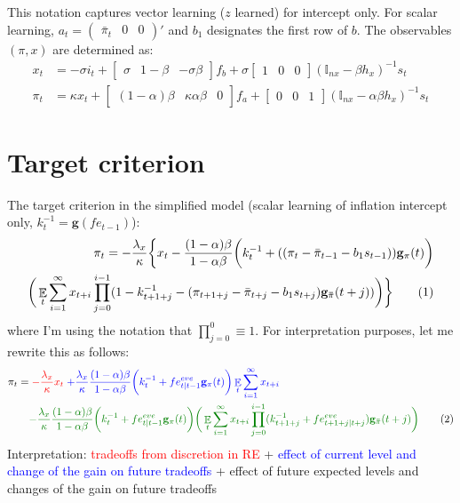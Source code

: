 \documentclass[11pt]{article}
\renewcommand{\[}{\begin{equation}}
\renewcommand{\]}{\end{equation}}
\DeclareMathOperator{\E}{\mathbb{E}}
\newcommand\numberthis{\addtocounter{equation}{1}\tag{\theequation}} %
\begin{document}
This notation captures vector learning ($z$ learned) for intercept only. For scalar learning, $a_t= \begin{pmatrix} \bar{\pi}_t & 0 & 0\end{pmatrix}' $ and $b_1$ designates the first row of $b$. The observables $(\pi, x)$ are determined as:
\begin{align}
x_t &=  -\sigma i_t + \begin{bmatrix} \sigma & 1-\beta & -\sigma\beta \end{bmatrix} f_b + \sigma \begin{bmatrix} 1 & 0 & 0 \end{bmatrix} (\mathbb{I}_{nx} - \beta h_x)^{-1} s_t \label{A9} \\
\pi_t &= \kappa x_t  + \begin{bmatrix} (1-\alpha)\beta & \kappa\alpha\beta & 0 \end{bmatrix}  f_a + \begin{bmatrix} 0 & 0 & 1 \end{bmatrix}  (\mathbb{I}_{nx} - \alpha \beta h_x)^{-1}  s_t \label{A10}
\end{align}

\section{Target criterion}\label{target_crit_levels}
The target criterion in the simplified model (scalar learning of inflation intercept only, $k_t^{-1} = \mathbf{g}(fe_{t-1})$):
\begin{align*}
\pi_t  = -\frac{\lambda_x}{\kappa}\bigg\{x_t - \frac{(1-\alpha)\beta}{1-\alpha\beta} \bigg(k_t^{-1}+((\pi_t - \bar{\pi}_{t-1}-b_1 s_{t-1}))\mathbf{g}_{\pi}(t) \bigg) \\
\bigg(\E_t\sum_{i=1}^{\infty}x_{t+i}\prod_{j=0}^{i-1}(1-k_{t+1+j}^{-1} - (\pi_{t+1+j} - \bar{\pi}_{t+j}-b_1 s_{t+j})\mathbf{g_{\bar{\pi}}}(t+j)) \bigg)
\bigg\} \numberthis \label{target}
\end{align*}
where I'm using the notation that $\prod_{j=0}^{0} \equiv 1$. For interpretation purposes, let me rewrite this as follows:
\begin{align*}
\pi_t  = & \; \textcolor{red}{-\frac{\lambda_x}{\kappa} x_t} \textcolor{blue}{ \; + \frac{\lambda_x}{\kappa} \frac{(1-\alpha)\beta}{1-\alpha\beta} \bigg(k_t^{-1}+ fe^{eve}_{t|t-1}\mathbf{g}_{\pi}(t) \bigg)\E_t\sum_{i=1}^{\infty}x_{t+i}}  \\
& \textcolor{mygreen}{- \frac{\lambda_x}{\kappa} \frac{(1-\alpha)\beta}{1-\alpha\beta} \bigg(k_t^{-1}+ fe^{eve}_{t|t-1}\mathbf{g}_{\pi}(t) \bigg) \bigg(\E_t\sum_{i=1}^{\infty}x_{t+i}\prod_{j=0}^{i-1}(k_{t+1+j}^{-1} + fe^{eve}_{t+1+j|t+j})\mathbf{g_{\bar{\pi}}}(t+j) \bigg)}
\numberthis \label{target_interpretation}
\end{align*}
Interpretation: \textcolor{red}{tradeoffs from discretion in RE} + \textcolor{blue}{effect of current level and change of the gain on future tradeoffs} + \textcolor{mygreen}{effect of future expected levels and changes of the gain on future tradeoffs}
\end{document}
